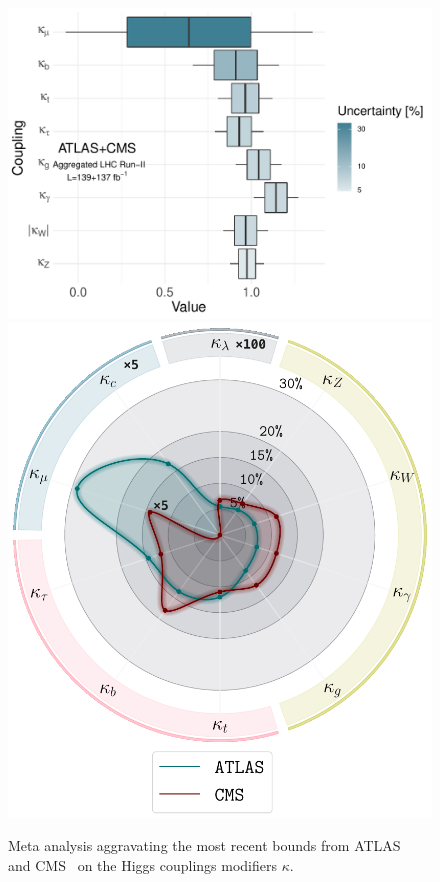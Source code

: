 \begin{figure}[htb!]
	\begin{center}
		\includegraphics[height=0.3\textheight]{figures/agg_higgs_couplings}
		\includegraphics[height=0.3\textheight]{figures/Higgs_couplings_poster}
		\caption{Meta analysis aggravating the most recent bounds from ATLAS~\cite{ATLAS2021vrm} and CMS~\cite{CMS:2020gsy} on the Higgs couplings modifiers $\kappa$.   }	
		\label{fig:couplings-bound}
	\end{center}
\end{figure}
